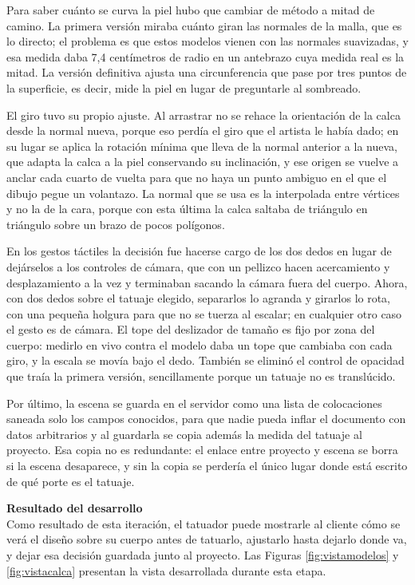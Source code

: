 \documentclass[12pt,letterpaper,oneside]{report}
\newcommand{\tituloparpegado}[1]{\par\textbf{#1}\\\indent\ignorespaces}
\begin{document}
Para saber cuánto se curva la piel hubo que cambiar de método a mitad de camino. La primera versión miraba cuánto giran las normales de la malla, que es lo directo; el problema es que estos modelos vienen con las normales suavizadas, y esa medida daba 7,4 centímetros de radio en un antebrazo cuya medida real es la mitad. La versión definitiva ajusta una circunferencia que pase por tres puntos de la superficie, es decir, mide la piel en lugar de preguntarle al sombreado. 


El giro tuvo su propio ajuste. Al arrastrar no se rehace la orientación de la calca desde la normal nueva, porque eso perdía el giro que el artista le había dado; en su lugar se aplica la rotación mínima que lleva de la normal anterior a la nueva, que adapta la calca a la piel conservando su inclinación, y ese origen se vuelve a anclar cada cuarto de vuelta para que no haya un punto ambiguo en el que el dibujo pegue un volantazo. La normal que se usa es la interpolada entre vértices y no la de la cara, porque con esta última la calca saltaba de triángulo en triángulo sobre un brazo de pocos polígonos.

En los gestos táctiles la decisión fue hacerse cargo de los dos dedos en lugar de dejárselos a los controles de cámara, que con un pellizco hacen acercamiento y desplazamiento a la vez y terminaban sacando la cámara fuera del cuerpo. Ahora, con dos dedos sobre el tatuaje elegido, separarlos lo agranda y girarlos lo rota, con una pequeña holgura para que no se tuerza al escalar; en cualquier otro caso el gesto es de cámara. El tope del deslizador de tamaño es fijo por zona del cuerpo: medirlo en vivo contra el modelo daba un tope que cambiaba con cada giro, y la escala se movía bajo el dedo. También se eliminó el control de opacidad que traía la primera versión, sencillamente porque un tatuaje no es translúcido.

Por último, la escena se guarda en el servidor como una lista de colocaciones saneada solo los campos conocidos, para que nadie pueda inflar el documento con datos arbitrarios y al guardarla se copia además la medida del tatuaje al proyecto. Esa copia no es redundante: el enlace entre proyecto y escena se borra si la escena desaparece, y sin la copia se perdería el único lugar donde está escrito de qué porte es el tatuaje.

\tituloparpegado{Resultado del desarrollo}
Como resultado de esta iteración, el tatuador puede mostrarle al cliente cómo se verá el diseño sobre su cuerpo antes de tatuarlo, ajustarlo hasta dejarlo donde va, y dejar esa decisión guardada junto al proyecto. Las Figuras \ref{fig:vistamodelos} y \ref{fig:vistacalca} presentan la vista desarrollada durante esta etapa.
\end{document}
